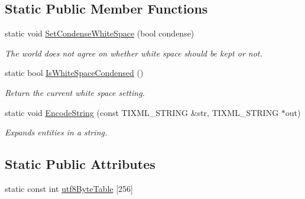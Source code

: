 \subsection*{Static Public Member Functions}
\begin{DoxyCompactItemize}
\item 
static void \hyperlink{classTiXmlBase_a0f799ec645bfb8d8a969e83478f379c1}{SetCondenseWhiteSpace} (bool condense)
\begin{DoxyCompactList}\small\item\em The world does not agree on whether white space should be kept or not. \item\end{DoxyCompactList}\item 
static bool \hyperlink{classTiXmlBase_ad4b1472531c647a25b1840a87ae42438}{IsWhiteSpaceCondensed} ()
\begin{DoxyCompactList}\small\item\em Return the current white space setting. \item\end{DoxyCompactList}\item 
static void \hyperlink{classTiXmlBase_a32ed202562b58de64c7d799ca3c9db98}{EncodeString} (const TIXML\_\-STRING \&str, TIXML\_\-STRING $\ast$out)
\begin{DoxyCompactList}\small\item\em Expands entities in a string. \item\end{DoxyCompactList}\end{DoxyCompactItemize}
\subsection*{Static Public Attributes}
\begin{DoxyCompactItemize}
\item 
static const int \hyperlink{classTiXmlBase_ac8c86058137bdb4b413c3eca58f2d467}{utf8ByteTable} \mbox{[}256\mbox{]}
\end{DoxyCompactItemize}

